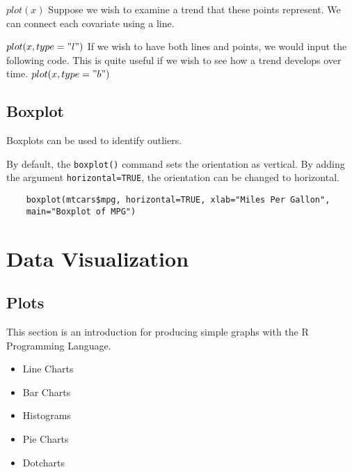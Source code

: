 \begin{frame}
$plot(x)$
Suppose we wish to examine a trend that these points represent. We can connect each covariate using a line.

$plot(x, type = "l")$
If we wish to have both lines and points, we would input the following code. This is quite useful if we wish to see how a trend develops over time.
$plot(x, type = "b")$














\section{Boxplot}
Boxplots can be used to identify outliers.

By default, the \texttt{boxplot()} command sets the orientation as vertical. By adding the argument \texttt{horizontal=TRUE}, the orientation can be changed to horizontal.
\footnotesize
\begin{framed}
	\begin{verbatim}
	boxplot(mtcars$mpg, horizontal=TRUE, xlab="Miles Per Gallon",
	main="Boxplot of MPG")
	\end{verbatim}
\end{framed}




\newpage


\chapter{Data Visualization}
\section{Plots}
This section is an introduction for producing simple graphs with
the R Programming Language.
\begin{itemize}
	\item Line Charts  \item Bar Charts \item Histograms \item Pie
	Charts \item Dotcharts
\end{itemize}




\end{frame}
